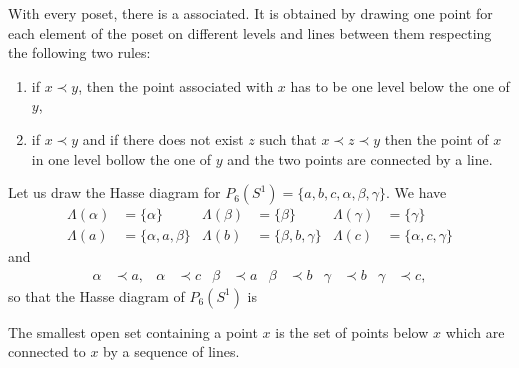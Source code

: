 With every poset, there is a  associated. It is obtained by drawing one point for each element of the poset on different levels and lines between them respecting the following two rules:
\begin{enumerate}
\item if $x\prec y$, then the point associated with $x$ has to be one level below the one of $y$,
\item if $x\prec y$ and if there does not exist $z$ such that $x\prec z\prec y$ then the point of $x$ in one level bollow the one of $y$ and the two points are connected by a line.
\end{enumerate}
Let us draw the Hasse diagram for $P_6(S^1)=\{ a,b,c,\alpha,\beta,\gamma \}$. We have
\begin{align*}
\Lambda(\alpha)&=\{ \alpha \}		&\Lambda(\beta)&=\{ \beta \}		&\Lambda(\gamma)&=\{ \gamma \}\\
\Lambda(a)&=\{ \alpha,a,\beta \}	&\Lambda(b)&=\{ \beta,b,\gamma \}	&\Lambda(c)&=\{ \alpha,c,\gamma \}
\end{align*}
and
\begin{align*}
\alpha&\prec a,	&\alpha&\prec c	&\beta&\prec a	&\beta&\prec b	&\gamma&\prec b	&\gamma&\prec c,
\end{align*}
so that the Hasse diagram of $P_6(S^1)$ is
\begin{center}

\end{center}
The smallest open set containing a point $x$ is the set of points below $x$ which are connected to $x$ by a sequence of lines.
